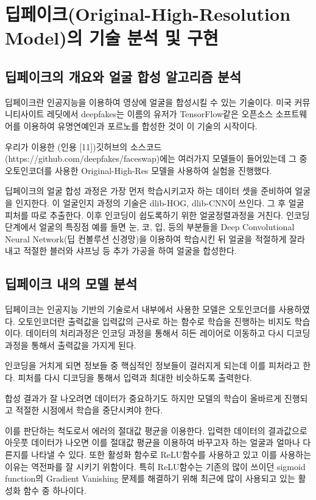 \documentclass{oblivoir}
\begin{document}
\chapter{딥페이크(Original-High-Resolution Model)의 기술 분석 및 구현}

   \section{ 딥페이크의 개요와 얼굴 합성 알고리즘 분석}

딥페이크란 인공지능을 이용하여 영상에 얼굴을 합성시킬 수 있는 기술이다. 미국 커뮤니티사이트 레딧에서 deepfakes는 이름의 유저가 TensorFlow같은 오픈소스 소프트웨어를 이용하여 유명연예인과 포르노를 합성한 것이 이 기술의 시작이다.

우리가 이용한 (인용 [11])깃허브의 소스코드(https://github.com/deepfakes/faceswap)에는 여러가지 모델들이 들어있는데 그 중 오토인코더를 사용한 Original-High-Res 모델을 사용하여 실험을 진행했다.

딥페이크의 얼굴 합성 과정은 가장 먼저 학습시키고자 하는 데이터 셋을 준비하여 얼굴을 인지한다. 이 얼굴인지 과정의 기술은 dlib-HOG, dlib-CNN이 쓰인다. 그 후 얼굴 피처를 따로 추출한다. 이후 인코딩이 쉽도록하기 위한 얼굴정렬과정을 거친다. 인코딩 단계에서 얼굴의 특징점 예를 들면 눈, 코, 입, 등의 부분들을 Deep Convolutional Neural Network(딥 컨볼루션 신경망)을 이용하여 학습시킨 뒤 얼굴을 적절하게 잘라내고 적절한 블러와 샤프닝 등 추가 가공을 하여 얼굴을 합성한다.

\section{ 딥페이크 내의 모델 분석}

딥페이크는 인공지능 기반의 기술로서 내부에서 사용한 모델은 오토인코더를 사용하였다. 오토인코더란 출력값을 입력값의 근사로 하는 함수로 학습을 진행하는 비지도 학습이다. 데이터의 처리과정은 인코딩 과정을 통해서 히든 레이어로 이동하고 다시 디코딩 과정을 통해서 출력값을 가지게 된다.

인코딩을 거치게 되면 정보들 중 핵심적인 정보들이 걸러지게 되는데 이를 피처라고 한다. 피처를 다시 디코딩을 통해서 입력과 최대한 비슷하도록 출력한다.

합성 결과가 잘 나오려면 데이터가 중요하기도 하지만 모델의 학습이 올바르게 진행되고 적절한 시점에서 학습을 중단시켜야 한다.

이를 판단하는 척도로서 에러의 절대값 평균을 이용한다. 입력한 데이터의 결과값으로 아웃풋 데이터가 나오면 이를 절대값 평균을 이용하여 바꾸고자 하는 얼굴과 얼마나 다른지를 나타낼 수 있다. 또한 활성화 함수로 ReLU함수를 사용하고 있고 이를 사용하는 이유는 역전파를 잘 시키기 위함이다. 특히 ReLU함수는 기존의 많이 쓰이던 sigmoid function의 Gradient Vanishing 문제를 해결하기 위해 최근에 많이 사용되고 있는 활성화 함수 중 하나이다.
\end{document}
